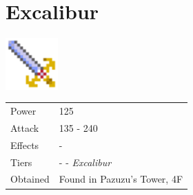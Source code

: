 \section{Excalibur}
\label{weapon:excalibur}

\includegraphics[height=2cm,keepaspectratio]{./resources/weapons/excalibur}

\begin{longtable}{ l p{9cm} }
	Power
	& 125
\\ %
	Attack
	& 135 - 240
\\ %
	Effects
	& -
\\ %
	Tiers
	& \nameref{weapon:steel_sword} - \nameref{weapon:knights_sword} - \textit{Excalibur}
\\ %
	Obtained
	& Found in Pazuzu’s Tower, 4F
\end{longtable}
